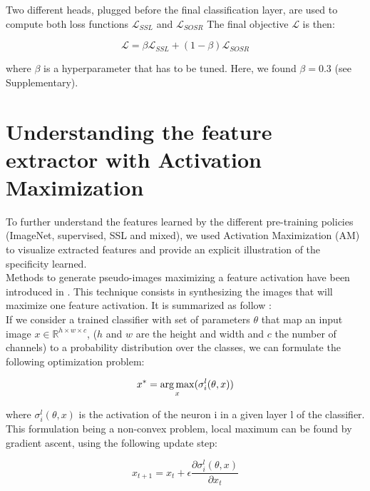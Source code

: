Two different heads, plugged before the final classification layer, are used to compute both loss functions $\mathcal{L}_{SSL}$  and $\mathcal{L}_{SOSR}$
The final objective $\mathcal{L}$ is then:

\begin{equation}
\mathcal{L} = \beta \mathcal{L}_{SSL} + (1- \beta) \mathcal{L}_{SOSR}
\label{eq:joint-eq}
\end{equation}

where $\beta$ is a hyperparameter that has to be tuned. Here, we found $\beta=0.3$ (see Supplementary).

\section{Understanding the feature extractor with Activation Maximization}
To further understand the features learned by the different pre-training policies (ImageNet, supervised, SSL and mixed), we used Activation Maximization (AM) to visualize extracted features  and provide an explicit  illustration of the specificity learned. \\
Methods to generate pseudo-images maximizing a feature activation have been introduced in \citep{erhan_visualizing_2009}. This technique consists in synthesizing the images that will maximize one feature activation. It is summarized as follow \citep{nguyen_understanding_2019}: \\
If we consider a trained classifier with set of parameters $\theta$ that map an input image $x \in \mathbb{R}^{h \times w \times c} $, ($h$ and $w$ are the height and width and $c$ the number of channels) to a probability distribution over the classes, we can formulate the following optimization problem:

\begin{equation}
x^{*} = \operatorname*{arg\,max}_{x}(\sigma^{l}_{i}(\theta, x))
\end{equation}

where $\sigma^{l}_{i}(\theta, x)$ is the activation of the neuron i in a given layer l of the classifier. This formulation being a non-convex problem, local maximum can be found by gradient ascent, using the following update step:

\begin{equation}
x_{t+1} = x_{t} + \epsilon \frac{\partial \sigma^{l}_{i}(\theta, x)}{\partial x_t}
\end{equation}


